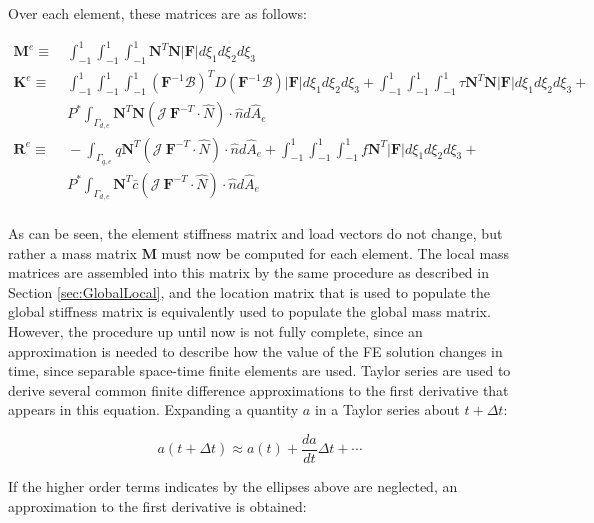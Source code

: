 \documentclass[10pt]{article}
\begin{document}
Over each element, these matrices are as follows:

\begin{equation}
\label{eq:FEWeakForm_element2}
\begin{aligned}
\textbf{M}^e\equiv&\ \int_{-1}^{1}\int_{-1}^{1}\int_{-1}^{1}\textbf{N}^T\textbf{N}|\textbf{F}|d\xi_1d\xi_2d\xi_3\\
\textbf{K}^e\equiv&\ \int_{-1}^{1}\int_{-1}^{1}\int_{-1}^{1}(\textbf{F}^{-1}\mathscr{B})^TD(\textbf{F}^{-1}\mathscr{B}) |\textbf{F}|d\xi_1d\xi_2d\xi_3+\int_{-1}^{1}\int_{-1}^{1}\int_{-1}^{1}\tau \textbf{N}^T\textbf{N} |\textbf{F}|d\xi_1d\xi_2d\xi_3+\quad\\
&\ P^{*}\int_{\Gamma_{d,e}}\textbf{N}^T\textbf{N} (\mathscr{J}\ \textbf{F}^{-T}\cdot\hat{N})\cdot\hat{n}d\hat{A}_e\\
\textbf{R}^e\equiv&\ -\int_{\Gamma_{q,e}}q\textbf{N}^T(\mathscr{J}\ \textbf{F}^{-T}\cdot\hat{N})\cdot\hat{n}d\hat{A}_e+\int_{-1}^{1}\int_{-1}^{1}\int_{-1}^{1}f\textbf{N}^T|\textbf{F}|d\xi_1d\xi_2d\xi_3+\quad\\
&\ P^{*}\int_{\Gamma_{d,e}}\textbf{N}^T\bar{c}(\mathscr{J}\ \textbf{F}^{-T}\cdot\hat{N})\cdot\hat{n}d\hat{A}_e\\
\end{aligned}
\end{equation}

As can be seen, the element stiffness matrix and load vectors do not change, but rather a mass matrix \(\textbf{M}\) must now be computed for each element. The local mass matrices are assembled into this matrix by the same procedure as described in Section \ref{sec:GlobalLocal}, and the location matrix that is used to populate the global stiffness matrix is equivalently used to populate the global mass matrix. However, the procedure up until now is not fully complete, since an approximation is needed to describe how the value of the FE solution changes in time, since separable space-time finite elements are used. Taylor series are used to derive several common finite difference approximations to the first derivative that appears in this equation. Expanding a quantity \(a\) in a Taylor series about \(t+\Delta t\):

\begin{equation}
a(t+\Delta t)\approx a(t)+\frac{da}{dt}\Delta t+\cdots
\end{equation}

If the higher order terms indicates by the ellipses above are neglected, an approximation to the first derivative is obtained:
\end{document}
